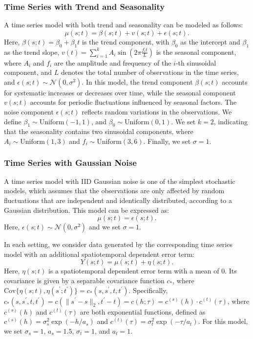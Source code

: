 \documentclass[11pt]{article}
\begin{document}
\subsubsection*{Time Series with Trend and Seasonality}
A time series model with both trend and seasonality can be modeled as follows:
\begin{equation}
	\mu(s;t) = \beta(s;t) + v(s;t) + \epsilon(s;t).
\end{equation}
Here, $\beta(s;t) = \beta_0 + \beta_1 t$ is the trend component, with $\beta_0$ as the intercept and $\beta_1$ as the trend slope, $v(t) = \sum_{i=1}^k A_i \sin\left(2 \pi \frac{f_i t}{L}\right)$ is the seasonal component, where $A_i$ and $f_i$ are the amplitude and frequency of the $i$-th sinusoidal component, and $L$ denotes the total number of observations in the time series, and $\epsilon(s;t) \sim \mathcal{N}(0, \sigma^2)$. In this model, the trend component $\beta(s;t)$ accounts for systematic increases or decreases over time, while the seasonal component $v(s;t)$ accounts for periodic fluctuations influenced by seasonal factors. The noise component $\epsilon(s;t)$ reflects random variations in the observations. We define $\beta_1 \sim \mathrm{Uniform}(-1, 1)$, and $\beta_0 \sim \mathrm{Uniform}(0, 1)$. We set $k = 2$, indicating that the seasonality contains two sinusoidal components, where $A_i \sim \mathrm{Uniform}(1, 3)$ and $f_i \sim \mathrm{Uniform}(3, 6)$. Finally, we set $\sigma=1$.





\subsubsection*{Time Series with Gaussian Noise}
A time series model with IID Gaussian noise is one of the simplest stochastic models, which assumes that the observations are only affected by random fluctuations that are independent and identically distributed, according to a Gaussian distribution. This model can be expressed as:
\begin{equation}
	\mu(s;t) = \epsilon(s;t).
\end{equation}
Here, $\epsilon(s;t) \sim \mathcal{N}(0, \sigma^2)$ and we set $\sigma=1$. 

In each setting, we consider data generated by the corresponding time series model with an additional spatiotemporal dependent error term:
\begin{equation}
	Y(s;t) = \mu(s;t) + \eta(s;t).
\end{equation}
Here, \(\eta(s;t)\) is a spatiotemporal dependent error term with a mean of 0. Its covariance is given by a separable covariance function \(c_{*}\), where \(\mathrm{Cov}\{\eta(s;t), \eta(s^{\prime}; t^{\prime})\} = c_{*}(s, s^{\prime}, t, t^{\prime})\). Specifically, \(c_{*}(s, s^{\prime}, t, t^{\prime}) = c(\| s^{\prime} - s \|_2, t^{\prime} - t) = c(h; \tau) = c^{(s)}(h) \cdot c^{(t)}(\tau)\), where \(c^{(s)}(h)\) and \(c^{(t)}(\tau)\) are both exponential functions, defined as \(c^{(s)}(h) = \sigma_s^2 \exp(-h/a_s)\) and \(c^{(t)}(\tau) = \sigma_t^2 \exp(-\tau/a_t)\). For this model, we set \(\sigma_s = 1\), \(a_s = 1.5\), \(\sigma_t = 1\), and \(a_t = 1\). 
\end{document}
